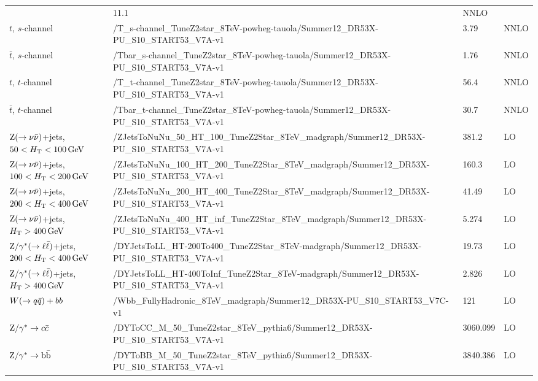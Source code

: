 \begin{sidewaystable}
\begin{center}
\begin{tabular}{l l l l}
& 11.1 & NNLO \\
$t$, $s$-channel &
/T\_s-channel\_TuneZ2star\_8TeV-powheg-tauola/Summer12\_DR53X-PU\_S10\_START53\_V7A-v1 & 3.79
& NNLO \\
$\bar{t}$, $s$-channel &
/Tbar\_s-channel\_TuneZ2star\_8TeV-powheg-tauola/Summer12\_DR53X-PU\_S10\_START53\_V7A-v1 &
1.76 & NNLO \\
$t$, $t$-channel &
/T\_t-channel\_TuneZ2star\_8TeV-powheg-tauola/Summer12\_DR53X-PU\_S10\_START53\_V7A-v1 & 56.4
& NNLO \\
$\bar{t}$, $t$-channel &
/Tbar\_t-channel\_TuneZ2star\_8TeV-powheg-tauola/Summer12\_DR53X-PU\_S10\_START53\_V7A-v1 &
30.7 & NNLO \\
\midrule
$\mathrm{Z} (\rightarrow \nu \bar{\nu})$+jets, $50 < H_{\mathrm{T}} < 100\,\text{Ge\hspace{-.08em}V}$ & 
/ZJetsToNuNu\_50\_HT\_100\_TuneZ2Star\_8TeV\_madgraph/Summer12\_DR53X-PU\_S10\_START53\_V7A-v1 
& 381.2 & LO \\
$\mathrm{Z} (\rightarrow \nu \bar{\nu})$+jets, $100 < H_{\mathrm{T}} < 200\,\text{Ge\hspace{-.08em}V}$ &
/ZJetsToNuNu\_100\_HT\_200\_TuneZ2Star\_8TeV\_madgraph/Summer12\_DR53X-PU\_S10\_START53\_V7A-v1 
& 160.3 & LO \\
$\mathrm{Z} (\rightarrow \nu \bar{\nu})$+jets, $200 < H_{\mathrm{T}} < 400\,\text{Ge\hspace{-.08em}V}$ &
/ZJetsToNuNu\_200\_HT\_400\_TuneZ2Star\_8TeV\_madgraph/Summer12\_DR53X-PU\_S10\_START53\_V7A-v1 
& 41.49 & LO \\
$\mathrm{Z} (\rightarrow \nu \bar{\nu})$+jets, $H_{\mathrm{T}} > 400\,\text{Ge\hspace{-.08em}V}$ &
/ZJetsToNuNu\_400\_HT\_inf\_TuneZ2Star\_8TeV\_madgraph/Summer12\_DR53X-PU\_S10\_START53\_V7A-v1 
& 5.274 & LO \\
\midrule
$\mathrm{Z}/\gamma^* (\rightarrow \ell \bar{\ell})$+jets, $200 < H_{\mathrm{T}} < 400\,\text{Ge\hspace{-.08em}V}$ &
/DYJetsToLL\_HT-200To400\_TuneZ2Star\_8TeV-madgraph/Summer12\_DR53X-PU\_S10\_START53\_V7A-v1
& 19.73 & LO \\
$\mathrm{Z}/\gamma^* (\rightarrow \ell \bar{\ell})$+jets, $H_{\mathrm{T}} > 400\,\text{Ge\hspace{-.08em}V}$ &
/DYJetsToLL\_HT-400ToInf\_TuneZ2Star\_8TeV-madgraph/Summer12\_DR53X-PU\_S10\_START53\_V7A-v1
& 2.826 & LO \\
\midrule
$W(\rightarrow q\bar{q})+bb$ & 
/Wbb\_FullyHadronic\_8TeV\_madgraph/Summer12\_DR53X-PU\_S10\_START53\_V7C-v1 & 121 & LO \\
$\mathrm{Z}/\gamma^*\rightarrow c\bar{c}$ & 
/DYToCC\_M\_50\_TuneZ2star\_8TeV\_pythia6/Summer12\_DR53X-PU\_S10\_START53\_V7A-v1 & 3060.099 & LO
\\
$\mathrm{Z}/\gamma^* \rightarrow \mathrm{b}\bar{\mathrm{b}}$ & 
/DYToBB\_M\_50\_TuneZ2star\_8TeV\_pythia6/Summer12\_DR53X-PU\_S10\_START53\_V7A-v1 & 3840.386 & LO
\\
\bottomrule
\end{tabular}
\end{center}
\label{tab:boost_mc_bg}
\end{sidewaystable}


